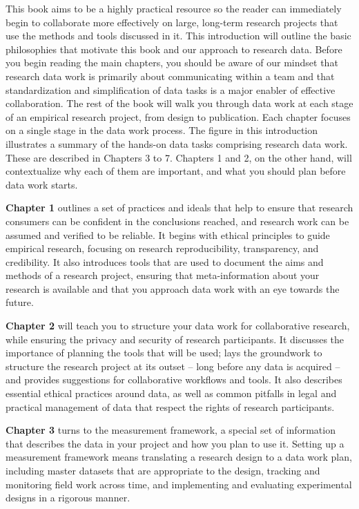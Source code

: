 This book aims to be a highly practical resource so the reader can
immediately begin to collaborate more effectively
on large, long-term research projects
that use the methods and tools discussed in it.
This introduction will outline the basic philosophies
that motivate this book and our approach to research data.
Before you begin reading the main chapters,
you should be aware of our mindset
that research data work is primarily about
communicating within a team
and that standardization and simplification of data tasks
is a major enabler of effective collaboration.
The rest of the book will walk you through data work at each stage
of an empirical research project, from design to publication.
Each chapter focuses on a single stage in the data work process.
The figure in this introduction illustrates
a summary of the hands-on data tasks 
comprising  research data work.
These are described in Chapters 3 to 7.
Chapters 1 and 2, on the other hand,
will contextualize why each of them are important,
and what you should plan before data work starts.

\textbf{Chapter 1} outlines a set of practices and ideals that help to ensure that
research consumers can be confident in the conclusions reached,
and research work can be assumed and verified to be reliable.
It begins with ethical principles to guide empirical research,
focusing on research reproducibility, transparency, and credibility.
It also introduces tools that are used to document
the aims and methods of a research project,
ensuring that meta-information about your research is available
and that you approach data work with an eye towards the future.

\textbf{Chapter 2} will teach you to structure your data work for collaborative research,
while ensuring the privacy and security of research participants.
It discusses the importance of planning the tools that will be used;
lays the groundwork to structure the research project at its outset --
long before any data is acquired --
and provides suggestions for collaborative workflows and tools.
It also describes essential ethical practices around data,
as well as common pitfalls in legal and practical management of data
that respect the rights of research participants.

\textbf{Chapter 3} turns to the measurement framework,
a special set of information that describes the data in your project
and how you plan to use it.
Setting up a measurement framework means translating a research design to a data work plan,
including master datasets that are appropriate to the design,
tracking and monitoring field work across time,
and implementing and evaluating experimental designs in a rigorous manner.

